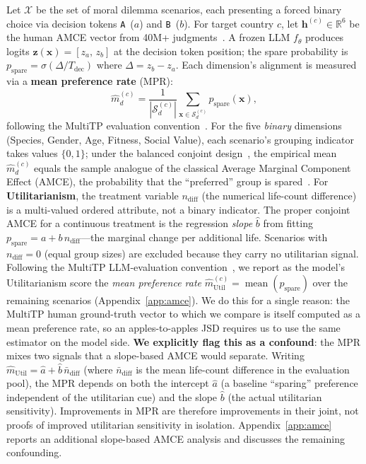 \documentclass{article}
\begin{document}
Let $\mathcal{X}$ be the set of moral dilemma scenarios, each presenting a forced
binary choice via decision tokens \texttt{A}~($a$) and \texttt{B}~($b$).
For target country $c$, let $\mathbf{h}^{(c)} \in \mathbb{R}^6$ be the human AMCE
vector from 40M+ judgments~\citep{awad2018moral}. A frozen LLM $f_\theta$ produces
logits $\mathbf{z}(\mathbf{x}) = [z_a,\, z_b]$ at the decision token position;
the spare probability is $p_{\text{spare}} = \sigma(\Delta / T_{\text{dec}})$
where $\Delta = z_b - z_a$.
Each dimension's alignment is measured via a \textbf{mean preference rate} (MPR):
\begin{equation}
  \hat{m}_d^{(c)} = \frac{1}{|\mathcal{S}_d^{(c)}|}\sum_{\mathbf{x} \in \mathcal{S}_d^{(c)}}
  p_{\text{spare}}(\mathbf{x}),
  \label{eq:mpr}
\end{equation}
following the MultiTP evaluation convention~\citep{jin2025multitp}.
For the five \emph{binary} dimensions (Species, Gender, Age, Fitness, Social
Value), each scenario's grouping indicator takes values $\{0,1\}$; under the
balanced conjoint design~\citep{awad2018moral}, the empirical mean
$\hat{m}_d^{(c)}$ equals the sample analogue of the classical Average Marginal
Component Effect (AMCE), the probability that the ``preferred'' group is
spared~\citep{awad2018moral}.
For \textbf{Utilitarianism}, the treatment variable $n_{\text{diff}}$ (the
numerical life-count difference) is a multi-valued ordered attribute, not a
binary indicator. The proper conjoint AMCE for a continuous treatment is the
regression \emph{slope} $\hat{b}$ from fitting
$p_{\text{spare}} = a + b\,n_{\text{diff}}$---the marginal change per
additional life.
Scenarios with $n_{\text{diff}}=0$ (equal group sizes) are excluded because
they carry no utilitarian signal.
Following the MultiTP LLM-evaluation convention~\citep{jin2025multitp}, we
report as the model's Utilitarianism score the \emph{mean preference rate}
$\hat{m}_{\text{Util}}^{(c)} = \operatorname{mean}(p_{\text{spare}})$ over the
remaining scenarios (Appendix~\ref{app:amce}). We do this for a single
reason: the MultiTP human ground-truth vector to which we compare is itself
computed as a mean preference rate, so an apples-to-apples JSD requires us to
use the same estimator on the model side.
\textbf{We explicitly flag this as a confound}: the MPR mixes two signals that
a slope-based AMCE would separate. Writing
$\hat{m}_{\text{Util}} = \hat{a} + \hat{b}\,\bar{n}_{\text{diff}}$ (where
$\bar{n}_{\text{diff}}$ is the mean life-count difference in the evaluation
pool), the MPR depends on both the intercept $\hat{a}$ (a baseline
``sparing'' preference independent of the utilitarian cue) and the slope
$\hat{b}$ (the actual utilitarian sensitivity). Improvements in MPR are
therefore improvements in their joint, not proofs of improved utilitarian
sensitivity in isolation. Appendix~\ref{app:amce} reports an additional
slope-based AMCE analysis and discusses the remaining confounding.
\end{document}
